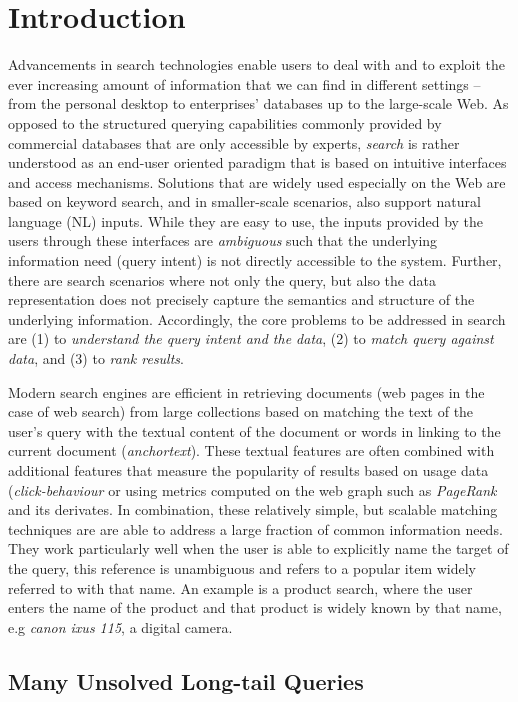 \section{Introduction}
Advancements in search technologies enable users to deal with and to exploit the ever increasing amount of information that we can find in different settings -- from the personal desktop to enterprises' databases up to the large-scale Web. As opposed to the structured querying capabilities commonly provided by commercial databases that are only accessible by experts, \emph{search} is rather understood as an end-user oriented paradigm that is based on intuitive interfaces and access mechanisms. Solutions that are widely used especially on the Web are based on keyword search, and in smaller-scale scenarios, also support natural language (NL) inputs. While they are easy to use, the inputs provided by the users through these interfaces are \emph{ambiguous} such that the underlying information need (query intent) is not directly accessible to the system. Further, there are search scenarios where not only the query, but also the data representation does not precisely capture the semantics and structure of the underlying information. Accordingly, the core problems to be addressed in search are (1) to \emph{understand the query intent and the data}, (2) to \emph{match query against data}, and (3) to \emph{rank results}. 

Modern search engines are efficient in retrieving documents (web pages in the case of web search) from large collections based on matching the text of the user's query with the textual content of the document or words in linking to the current document (\emph{anchortext}). These textual features are often combined with additional features that measure the popularity of results based on usage data (\emph{click-behaviour} or using metrics computed on the web graph such as \emph{PageRank} and its derivates. In combination, these relatively simple, but scalable matching techniques are are able to address a large fraction of common information needs. They work particularly well when the user is able to explicitly name the target of the query, this reference is unambiguous and refers to a popular item widely referred to with that name. An example is a product search, where the user enters the name of the product and that product is widely known by that name, e.g \emph{canon ixus 115}, a digital camera.


\subsection{Many Unsolved Long-tail Queries}

